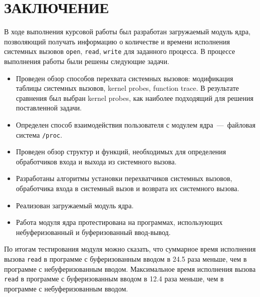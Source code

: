 \chapter*{ЗАКЛЮЧЕНИЕ}

В ходе выполнения курсовой работы был разработан загружаемый модуль ядра, позволяющий получать информацию о количестве и времени исполнения системных вызовов \texttt{open}, \texttt{read}, \texttt{write} для заданного процесса. В процессе выполнения работы были решены следующие задачи.

\begin{itemize}
	\item Проведен обзор способов перехвата системных вызовов: модификация таблицы системных вызовов, kernel probes, function trace. В результате сравнения был выбран kernel probes, как наиболее подходящий для решения поставленной задачи.
	\item Определен способ взаимодействия пользователя с модулем ядра~---~файловая система \texttt{/proc}.
	\item Проведен обзор структур и функций, необходимых для определения обработчиков входа и выхода из системного вызова.
	\item Разработаны алгоритмы установки перехватчиков системных вызовов, обработчика входа в системный вызов и возврата их системного вызова.
	\item Реализован загружаемый модуль ядра.
	\item Работа модуля ядра протестирована на программах, использующих небуферизованный и буферизованный ввод-вывод.
\end{itemize}

По итогам тестирования модуля можно сказать, что суммарное время исполнения вызова \texttt{read} в программе с буферизованным вводом в 24.5 раза меньше, чем в программе с небуферизованным вводом. Максимальное время исполнения вызова \texttt{read} в программе с буферизованным вводом в 12.4 раза меньше, чем в программе с небуферизованным вводом.